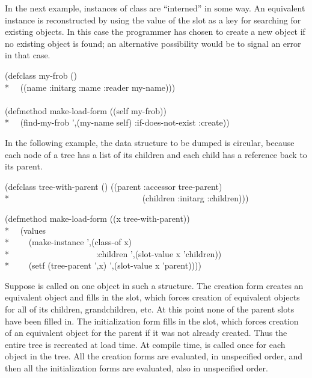 \begin{newer}
\begin{defun}
In the next example, instances of class  are ``interned'' in some way.
  An equivalent instance is reconstructed by using the value of the
   slot as a key for searching for existing objects.  In this case
  the programmer has chosen to create a new object if no existing
  object is found; an alternative possibility would be to signal an
  error in that case.
\begin{lisp}
(defclass my-frob () \\*
~~((name :initarg :name :reader my-name))) \\
\\
(defmethod make-load-form ((self my-frob)) \\*
~~{\Xbq}(find-my-frob ',(my-name self) :if-does-not-exist :create))
\end{lisp}

  In the following example, the data structure to be dumped is circular, because
  each node of a tree has a list of its children and each child has a reference
  back to its parent.  
\begin{lisp}
(defclass tree-with-parent () ((parent :accessor tree-parent) \\*
~~~~~~~~~~~~~~~~~~~~~~~~~~~~~~~(children :initarg :children)))
\end{lisp}

\begin{lisp}
(defmethod make-load-form ((x tree-with-parent)) \\*
~~(values \\*
~~~~{\Xbq}(make-instance ',(class-of x) \\*
~~~~~~~~~~~~~~~~~~~~:children ',(slot-value x 'children)) \\*
~~~~{\Xbq}(setf (tree-parent ',x) ',(slot-value x 'parent))))
\end{lisp}
Suppose  is called on one object in
  such a structure.  The creation form creates an equivalent object and
  fills in the  slot, which forces creation of equivalent
  objects for all of its children, grandchildren, etc.  At this point
  none of the parent slots have been filled in.  The initialization form
  fills in the  slot, which forces creation of an equivalent
  object for the parent if it was not already created.  Thus the entire
  tree is recreated at load time.  At compile time,  is
  called once for each object in the tree.  All the creation forms
  are evaluated, in unspecified order, and then all  the
  initialization forms are evaluated, also in unspecified order.


\end{defun}
\end{newer}
